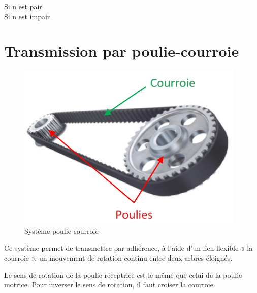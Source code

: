 \documentclass[10pt,fleqn]{article} %
\begin{document}
\begin{warn}
\begin{description}
  \item [Si n est pair] 
  \item [Si n est impair] 
\end{description}
\end{warn}

\section{Transmission par poulie-courroie}
\begin{figure}[h]
  \centering
  \includegraphics[width=.4\textwidth]{images/poulie-courroie}
  \caption{Système poulie-courroie}
  \label{}
\end{figure}
Ce système permet de transmettre par adhérence, à l’aide d’un lien flexible « la courroie », un mouvement de rotation continu entre deux arbres éloignés.


\begin{aretenir}
  \vspace{4cm}
\end{aretenir}

\begin{warn}
  Le sens de rotation de la poulie réceptrice est le même que celui de la poulie motrice. Pour inverser le sens de rotation, il faut croiser la courroie.
\end{warn}
\end{document}
